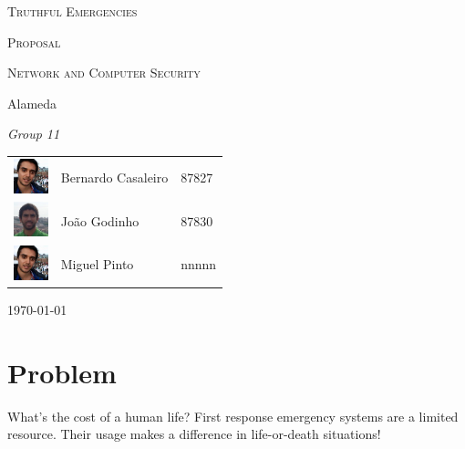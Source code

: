 \documentclass[a4paper,titlepage,11pt]{article}
\begin{document}
\begin{titlepage}
  \begin{center}
    {\scshape \huge Truthful Emergencies \par}
    \vspace{1cm}

    {\scshape \LARGE Proposal \par}
    \vspace{1.5cm}

    {\scshape \Large Network and Computer Security \par}
    \vspace{0.5cm}

    {\Large Alameda \par}
    \vfill

    {\itshape \Large Group 11 \par}
    \vfill

    \begin{tabular}{l l l}
      \includegraphics[width=10mm, height=10mm]{img/bernardo.jpeg} & Bernardo Casaleiro & 87827\\
      \includegraphics[width=10mm, height=10mm]{img/joao.jpeg} & João Godinho & 87830\\                       %
      \includegraphics[width=10mm, height=10mm]{img/bernardo.jpeg} & Miguel Pinto & nnnnn\\                       %
    \end{tabular}
    \vfill

    {\large \today\par}
  \end{center}
\end{titlepage}

\section{Problem}
What's the cost of a human life?
First response emergency systems are a limited resource. Their usage makes a difference in life-or-death situations!
\end{document}
